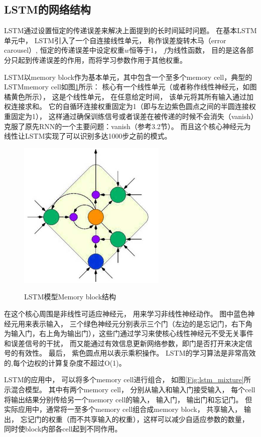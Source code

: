 \subsection{LSTM的网络结构}
LSTM通过设置恒定的传递误差来解决上面提到的长时间延时问题。 在基本LSTM单元中， LSTM引入了一个自连接线性单元， 称作误差旋转木马（error carousel）, 恒定的传递误差中设定权重$w$恒等于1， $f$为线性函数， 目的是这各部分只起到传递误差的作用，而将学习参数作用于其他权重。

LSTM以memory block作为基本单元，其中包含一个至多个memory cell，典型的LSTMmemory cell如图\ref{Fig:lstm_simple}所示：
核心有一个线性单元（或者称作线性神经元，如图橘黄色所示）， 这是个线性单元， 在任意给定时间， 该单元将其所有输入通过加权连接求和。 它的自循环连接权重固定为1（即与左边紫色圆点之间的半圆连接权重固定为1）， 这样通过确保训练信号或者误差在被传递的时候不会消失（vanish）克服了原先RNN的一个主要问题：vanish（参考3.2节）。 而且这个核心神经元为线性让LSTM实现了可以识别多达1000步之前的模式。


\begin{figure}[htb]
  \centering
  \includegraphics{Pictures/LSTM/lstm_simple.png}\\
  \caption{LSTM模型Memory block结构}\label{Fig:lstm_simple}
\end{figure}

在这个核心周围是非线性可适应神经元， 用来学习非线性神经动作。 图中蓝色神经元用来表示输入， 三个绿色神经元分别表示三个门（左边的是忘记门，右下角为输入门，右上角为输出门），这些门通过学习来使核心线性神经元不受无关事件和误差信号的干扰， 而又能通过有效信息更新网络参数，即门是否打开来决定信号的有效性。 最后， 紫色圆点用以表示乘积操作。 LSTM的学习算法是非常高效的,每个边权的计算复杂度不超过O(1)。


LSTM的应用中， 可以将多个memory cell进行组合， 如图\ref{Fig:lstm_mixture}所示混合模型。 其中有两个memory cell， 分别从输入和输入门接受输入， 每个cell将输出结果分别传给另一个memory cell的输入， 输入门， 输出门和忘记门。 但实际应用中，通常将一至多个memory cell组合成memory block， 共享输入， 输出， 忘记门的权重（而不共享输入的权重），这样可以减少自适应参数的数量， 同时使block内部各cell起到不同作用。 

